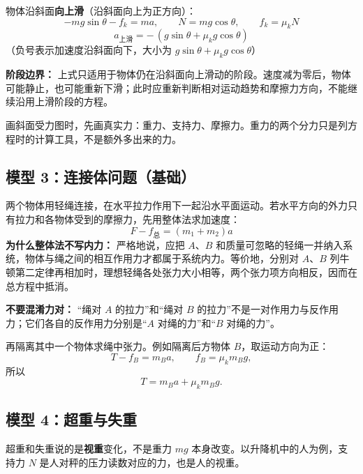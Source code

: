 物体沿斜面\textbf{向上滑}（沿斜面向上为正方向）：
\[
-mg\sin\theta - f_k = ma,\qquad N = mg\cos\theta,\qquad f_k = \mu_k N
\]
\[
a_{\text{上滑}} = -\,(g\sin\theta + \mu_k g\cos\theta)
\]
（负号表示加速度沿斜面向下，大小为 $g\sin\theta + \mu_k g\cos\theta$）

\textbf{阶段边界：} 上式只适用于物体仍在沿斜面向上滑动的阶段。速度减为零后，物体可能静止，也可能重新下滑；此时应重新判断相对运动趋势和摩擦力方向，不能继续沿用上滑阶段的方程。

画斜面受力图时，先画真实力：重力、支持力、摩擦力。重力的两个分力只是列方程时的计算工具，不是额外多出来的力。

\begin{center}


\nopagebreak
{}\label{fig:newton-incline}
\end{center}

\subsection*{模型 3：连接体问题（基础）}

两个物体用轻绳连接，在水平拉力作用下一起沿水平面运动。若水平方向的外力只有拉力和各物体受到的摩擦力，先用整体法求加速度：
\[
F - f_{\text{总}} = (m_1 + m_2) a
\]
\textbf{为什么整体法不写内力：} 严格地说，应把 $A$、$B$ 和质量可忽略的轻绳一并纳入系统，物体与绳之间的相互作用力才都属于系统内力。等价地，分别对 $A$、$B$ 列牛顿第二定律再相加时，理想轻绳各处张力大小相等，两个张力项方向相反，因而在总方程中抵消。

\textbf{不要混淆力对：} “绳对 $A$ 的拉力”和“绳对 $B$ 的拉力”不是一对作用力与反作用力；它们各自的反作用力分别是“$A$ 对绳的力”和“$B$ 对绳的力”。

再隔离其中一个物体求绳中张力。例如隔离后方物体 $B$，取运动方向为正：
\[
T-f_B=m_Ba,\qquad f_B=\mu_km_Bg,
\]
所以
\[
T=m_Ba+\mu_km_Bg.
\]

\begin{center}


\label{fig:connected-body-newton}
\end{center}

\subsection*{模型 4：超重与失重}

超重和失重说的是\textbf{视重}变化，不是重力 $mg$ 本身改变。以升降机中的人为例，支持力 $N$ 是人对秤的压力读数对应的力，也是人的视重。

